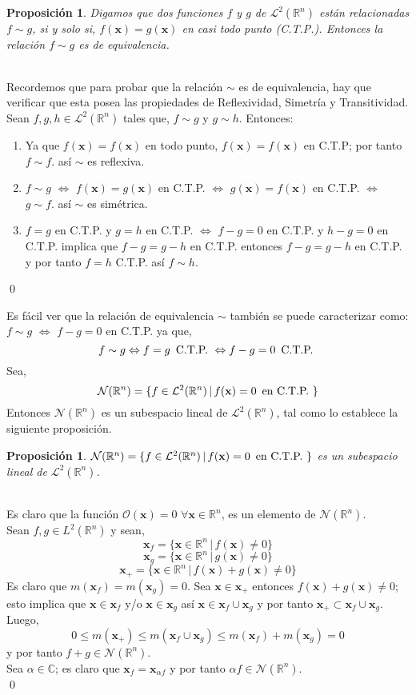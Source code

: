 \documentclass[12pt]{book}
\numberwithin{equation}{chapter}
\newtheorem{proposition}[theorem]{Proposici\'on}
\def\n{\noindent}
\def\R{\mathbb{R}}
\def\C{\mathbb{C}}
\def\L{\mathcal{L}}
\def\sss{\Leftrightarrow}
\def\N{\mathcal{N}}
\def\x{\mathbf{x}}
\begin{document}
\begin{proposition}\label{eqv-l2}
Digamos que dos funciones $f$ y $g$ de $\L^{2}(\R^{n})$ est\'an relacionadas $f \sim g$, si y solo si, $ f(\x)=g(\x) $ en casi todo punto (C.T.P.). Entonces la relaci\'on $f \sim g$ es de equivalencia.
\end{proposition}
\n {\bf Demostraci\'on}\\
Recordemos que para probar que la relaci\'on $\sim$ es de equivalencia, hay que verificar que esta posea las propiedades de Reflexividad, Simetr\'ia y Transitividad. \\
Sean $f,g,h \in \L^{2}(\R^{n})$ tales que, $f \sim g$ y $g \sim h$. Entonces:
\begin{enumerate}
\item Ya que $f(\x)= f(\x)$ en todo punto, $f(\x)= f(\x)$ en C.T.P; por tanto $f \sim f$. as\'i $\sim$ es reflexiva.

\item $f \sim g$ $\sss$ $f(\x) = g(\x)$ en C.T.P. $\sss$ $g(\x) = f(\x)$ en C.T.P. $\sss$ $g \sim f$. as\'i $\sim$ es sim\'etrica.

\item $f=g$ en C.T.P. y $g=h$ en C.T.P. $\sss$ $f-g=0$ en C.T.P. y $h-g=0$ en C.T.P. implica que $ f-g=g-h$ en C.T.P. entonces $f-g=g-h$ en C.T.P. y por tanto $f=h$ C.T.P. as\'i $f\sim h$.
\end{enumerate}
 \qed

\vspace{5 mm}

Es f\'acil ver que la relaci\'on de equivalencia $\sim$ tambi\'en se puede caracterizar como: $f\sim g$ $\sss$ $ f-g =0$ en C.T.P. ya que,
$$ f \sim g \sss f=g \, \hbox{ C.T.P. } \sss f-g =0  \, \hbox{ C.T.P. } $$
Sea,
$$ \N(\R^{n})= \{ f \in \L^{2}(\R^{n}) \,|\, f(\x)=0 \, \hbox{ en C.T.P. } \} $$
Entonces $\N(\R^{n})$ es un subespacio lineal de $\L^{2} (\R^{n})$, tal como lo establece la siguiente proposici\'on.

\begin{proposition}
$\N(\R^{n})= \{ f \in \L^{2}(\R^{n}) \,|\, f(\x)=0 \, \hbox{ en C.T.P. } \}$ es un subespacio lineal de $\L^{2}(\R^{n})$.
\end{proposition}
\n {\bf Demostraci\'on}\\
Es claro que la funci\'on $\mathcal{O}(\x)=0$ $\forall \x \in \R^{n}$, es un elemento de $\N(\R^{n})$.\\
Sean $f,g \in L^{2}(\R^{n})$ y sean,
$$ \x_{f}=\{ \x \in \R^{n} \,|\, f(\x) \neq 0  \} $$
$$ \x_{g}=\{ \x \in \R^{n} \,|\,g(\x) \neq 0  \} $$
$$ \x_{+}=\{ \x \in \R^{n} \,|\, f(\x)+g(\x) \neq 0  \} $$
Es claro que $m(\x_{f})= m(\x_{g}) = 0$. Sea $\x \in \x_{+}$ entonces $f(\x)+g(\x) \neq 0$; esto implica que $ \x \in \x_{f} $ y/o $  \x \in \x_{g}$ as\'i $\x \in \x_{f} \cup \x_{g} $ y por tanto $ \x_{+} \subset \x_{f} \cup \x_{g} $. Luego,
$$ 0 \leq m(\x_{+}) \leq m(\x_{f} \cup \x_{g}) \leq m(\x_{f})+ m(\x_{g})=0 $$
y por tanto $f+g \in \N(\R^{n})$.\\
Sea $\alpha \in \C$; es claro que $ \x_{f}= \x_{\alpha f} $ y por tanto $\alpha f \in \N(\R^{n})$. \\ \qed 
\end{document}

